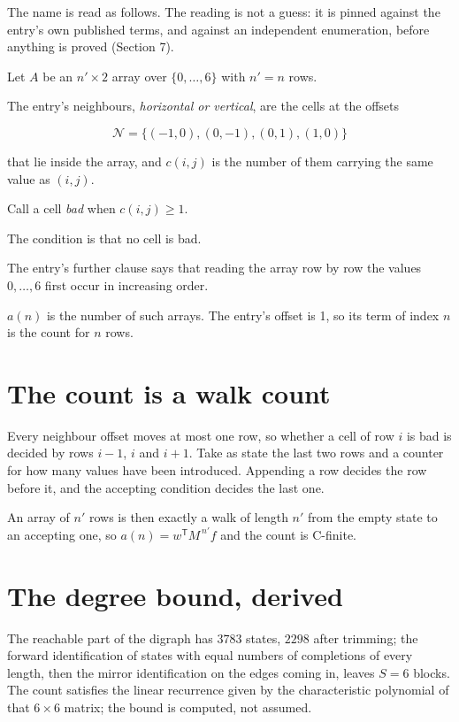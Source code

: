 \documentclass[11pt]{article}
\theoremstyle{definition}
\begin{document}
The name is read as follows. The reading is not a guess: it is pinned against the entry's own published terms, and against an independent enumeration, before anything is proved (Section 7).

Let $A$ be an $n' \times 2$ array over $\{0,\dots,6\}$ with $n' = n$ rows.

The entry's neighbours, {\itshape horizontal or vertical}, are the cells at the offsets

\[\mathcal{N} = \{(-1,0), (0,-1), (0,1), (1,0)\}\]

that lie inside the array, and $c(i,j)$ is the number of them carrying the same value as $(i,j)$.

Call a cell {\itshape bad} when $c(i,j) \ge 1$.

The condition is that no cell is bad.

The entry's further clause says that reading the array row by row the values $0,\dots,6$ first occur in increasing order.

$a(n)$ is the number of such arrays. The entry's offset is 1, so its term of index $n$ is the count for $n$ rows.

\section{The count is a walk count}

Every neighbour offset moves at most one row, so whether a cell of row $i$ is bad is decided by rows $i-1$, $i$ and $i+1$. Take as state the last two rows and a counter for how many values have been introduced. Appending a row decides the row before it, and the accepting condition decides the last one.

An array of $n'$ rows is then exactly a walk of length $n'$ from the empty state to an accepting one, so $a(n) = w^{\mathsf T}M^{\,n'}f$ and the count is C-finite.

\section{The degree bound, derived}

The reachable part of the digraph has $3783$ states, $2298$ after trimming; the forward identification of states with equal numbers of completions of every length, then the mirror identification on the edges coming in, leaves $S = 6$ blocks. The count satisfies the linear recurrence given by the characteristic polynomial of that $6\times6$ matrix; the bound is computed, not assumed.
\end{document}
